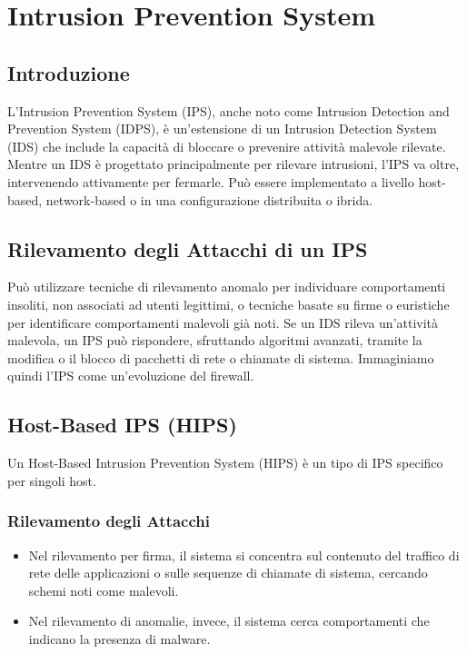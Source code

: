 \section{Intrusion Prevention System}

\subsection{Introduzione}

L'Intrusion Prevention System (IPS), anche noto come Intrusion Detection and Prevention System (IDPS), è un'estensione di un Intrusion Detection System (IDS) che include la capacità di bloccare o prevenire attività malevole rilevate. Mentre un IDS è progettato principalmente per rilevare intrusioni, l'IPS va oltre, intervenendo attivamente per fermarle. Può essere implementato a livello host-based, network-based o in una configurazione distribuita o ibrida.

\subsection{Rilevamento degli Attacchi di un IPS}

Può utilizzare tecniche di rilevamento anomalo per individuare comportamenti insoliti, non associati ad utenti legittimi, o tecniche basate su firme o euristiche per identificare comportamenti malevoli già noti. Se un IDS rileva un'attività malevola, un IPS può rispondere, sfruttando algoritmi avanzati, tramite la modifica o il blocco di pacchetti di rete o chiamate di sistema. Immaginiamo quindi l'IPS come un'evoluzione del firewall.

\subsection{Host-Based IPS (HIPS)}

Un Host-Based Intrusion Prevention System (HIPS) è un tipo di IPS specifico per singoli host.

\subsubsection{Rilevamento degli Attacchi}

\begin{itemize}
    \item Nel rilevamento per firma, il sistema si concentra sul contenuto del traffico di rete delle applicazioni o sulle sequenze di chiamate di sistema, cercando schemi noti come malevoli.
    \item Nel rilevamento di anomalie, invece, il sistema cerca comportamenti che indicano la presenza di malware.
\end{itemize}

